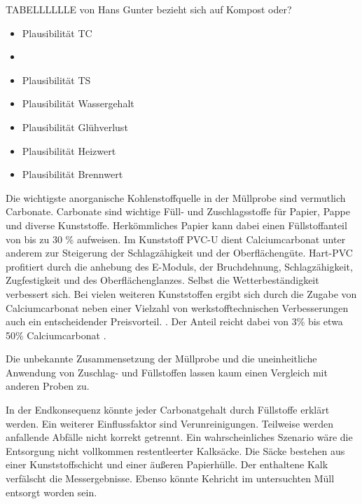 TABELLLLLLE von \cite{HansGunterRamke.}
Hans Gunter bezieht sich auf Kompost oder? 
\vspace*{5mm}

\begin{itemize}
	\item Plausibilität TC \cite{HansGunterRamke.}
	\item 
	\item Plausibilität TS
	\item Plausibilität Wassergehalt
	\item Plausibilität Glühverlust
	\item Plausibilität Heizwert \cite{S.Furkus.}
	\item Plausibilität Brennwert \cite{S.Furkus.}
\end{itemize}



\newpage

Die wichtigste anorganische Kohlenstoffquelle in der Müllprobe sind vermutlich Carbonate.
Carbonate sind wichtige Füll- und Zuschlagsstoffe für Papier, Pappe und diverse Kunststoffe. Herkömmliches Papier kann dabei einen Füllstoffanteil von bis zu 30 \% \cite{Wikipedia.21.11.2019} aufweisen. Im Kunststoff PVC-U dient Calciumcarbonat unter anderem zur Steigerung der Schlagzähigkeit und der Oberflächengüte. Hart-PVC profitiert durch die anhebung des E-Moduls, der Bruchdehnung, Schlagzähigkeit, Zugfestigkeit und des Oberflächenglanzes. Selbst die Wetterbeständigkeit verbessert sich. Bei vielen weiteren Kunststoffen ergibt sich durch die Zugabe von Calciumcarbonat neben einer Vielzahl von werkstofftechnischen Verbesserungen auch ein  entscheidender Preisvorteil. \cite{domininghausKunststoffeUndIhre1998}. Der Anteil reicht dabei von 3\% bis etwa 50\% Calciumcarbonat \cite{domininghausKunststoffeUndIhre1998}.

Die unbekannte Zusammensetzung der Müllprobe und die uneinheitliche Anwendung von Zuschlag- und Füllstoffen lassen kaum einen Vergleich mit anderen Proben zu. 

In der Endkonsequenz könnte jeder Carbonatgehalt durch Füllstoffe erklärt werden. Ein weiterer Einflussfaktor sind Verunreinigungen. Teilweise werden anfallende Abfälle nicht korrekt getrennt. Ein wahrscheinliches Szenario wäre die Entsorgung nicht vollkommen restentleerter Kalksäcke. Die Säcke bestehen aus einer Kunststoffschicht und einer äußeren Papierhülle. Der enthaltene Kalk verfälscht die Messergebnisse. Ebenso könnte Kehricht im untersuchten Müll entsorgt worden sein.

